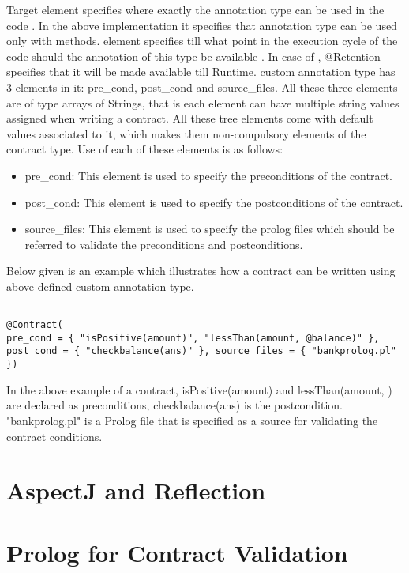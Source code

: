 Target element specifies where exactly the annotation type can be used in the code \cite{JavaAnnotationsTutorial}. In the above implementation it specifies that \@contract annotation type can be used only with methods. 
\@Retention element specifies till what point in the execution cycle of the code should the annotation of this type be available \cite{JavaAnnotationsTutorial}. In case of \@contract, @Retention specifies that it will be made available till Runtime.   
\@Contract custom annotation type has 3 elements in it: pre\_cond, post\_cond and source\_files. All these three elements are of type arrays of Strings, that is each element can have multiple string values assigned when writing a contract. All these tree elements come with default values associated to it, which makes them non-compulsory elements of the contract type. Use of each of these elements is as follows:
\begin{itemize}
\item pre\_cond: This element is used to specify the preconditions of the contract.
\item post\_cond: This element is used to specify the postconditions of the contract.
\item source\_files: This element is used to specify the prolog files which should be referred to validate the preconditions and postconditions.
\end{itemize} 

Below given is an example which illustrates how a contract can be written using above defined \@contract custom annotation type.
\linebreak


\begin{minipage}{\linewidth}
\lstset{language=Java, caption=CustomAnnotationtypeJava, captionpos=b, breaklines=true}       
\begin{lstlisting}[frame=single]

@Contract(
pre_cond = { "isPositive(amount)", "lessThan(amount, @balance)" }, 
post_cond = { "checkbalance(ans)" }, source_files = { "bankprolog.pl" })

\end{lstlisting}
\end{minipage}

In the above example of a contract, isPositive(amount) and lessThan(amount, \@balance) are declared as preconditions, checkbalance(ans) is the postcondition. "bankprolog.pl" is a Prolog file that is specified as a source for validating the contract conditions.

\section{AspectJ and Reflection}

\section{Prolog for Contract Validation}

\section{} 
  